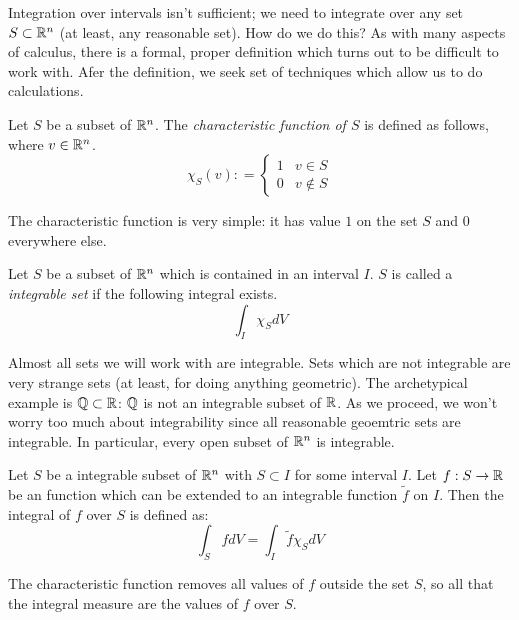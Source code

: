 \documentclass[fleqn,letterpaper]{report}
\begin{document}
Integration over intervals isn't sufficient; we need to
integrate over any set $S \subset \mathbb{R}^n$ (at least, any
reasonable set). How do we do this? As with many aspects of
calculus, there is a formal, proper definition which turns out
to be difficult to work with. Afer the definition, we seek
set of techniques which allow us to do calculations.

\begin{defn}
Let $S$ be a subset of $\mathbb{R}^n$. The \emph{characteristic
function of $S$} is defined as follows, where $v \in \mathbb{R}^n$.
\begin{equation*}
\chi_S (v) : = \left\{ \begin{matrix} 1 & v \in S \\ 0 & v
\notin S \end{matrix} \right.
\end{equation*}
\end{defn}

The characteristic function is very simple: it has value $1$
on the set $S$ and $0$ everywhere else.

\begin{defn}
Let $S$ be a subset of $\mathbb{R}^n$ which is contained in an
interval $I$. $S$ is called a \emph{integrable set} if the following
integral exists.
\begin{equation*}
\int_I \chi_S dV
\end{equation*}
\end{defn}

Almost all sets we will work with are integrable. Sets which
are not integrable are very strange sets (at least, for doing
anything geometric). The archetypical example is $\mathbb{Q} \subset
\mathbb{R}$: $\mathbb{Q}$ is not an integrable subset of $\mathbb{R}$. As we
proceed, we won't worry too much about integrability since all
reasonable geoemtric sets are integrable. In particular, every
open subset of $\mathbb{R}^n$ is integrable.

\begin{defn}
Let $S$ be a integrable subset of $\mathbb{R}^n$ with $S
\subset I$ for some interval $I$. Let $f: S \rightarrow \mathbb{R}$
be an function which can be extended to an integrable function
$\tilde{f}$ on $I$. Then the integral of $f$ over $S$ is defined as:
\begin{equation*}
\int_S f dV = \int_I \tilde{f} \chi_S dV
\end{equation*}
\end{defn}

The characteristic function removes all values of $f$ outside
the set $S$, so all that the integral measure are the values
of $f$ over $S$.
\end{document}
